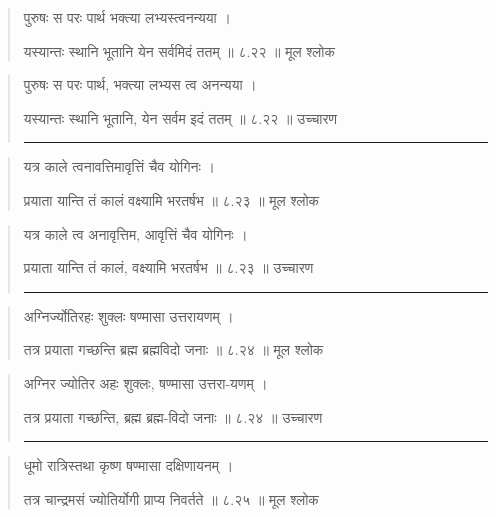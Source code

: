 \begin{quotation} 

पुरुषः स परः पार्थ भक्त्या लभ्यस्त्वनन्यया  ।  

यस्यान्तः स्थानि भूतानि येन सर्वमिदं ततम्‌  ॥ ८.२२ ॥  मूल श्लोक
\end{quotation}

\begin{quotation}

पुरुषः स परः पार्थ, भक्त्या लभ्यस त्व अनन्यया  ।  

यस्यान्तः स्थानि भूतानि, येन सर्वम इदं ततम्‌  ॥ ८.२२ ॥  उच्चारण

\noindent\rule{16cm}{0.4pt} 
\end{quotation}


\begin{quotation} 

यत्र काले त्वनावत्तिमावृत्तिं चैव योगिनः  ।  

प्रयाता यान्ति तं कालं वक्ष्यामि भरतर्षभ  ॥ ८.२३ ॥  मूल श्लोक
\end{quotation}

\begin{quotation}

यत्र काले त्व अनावृत्तिम, आवृत्तिं चैव योगिनः  ।  

प्रयाता यान्ति तं कालं, वक्ष्यामि भरतर्षभ  ॥ ८.२३ ॥  उच्चारण

\noindent\rule{16cm}{0.4pt} 
\end{quotation}


\begin{quotation} 

अग्निर्ज्योतिरहः शुक्लः षण्मासा उत्तरायणम्‌  ।  

तत्र प्रयाता गच्छन्ति ब्रह्म ब्रह्मविदो जनाः  ॥ ८.२४ ॥  मूल श्लोक
\end{quotation}

\begin{quotation}

अग्निर ज्योतिर अहः शुक्लः, षण्मासा उत्तरा-यणम्‌  ।  

तत्र प्रयाता गच्छन्ति, ब्रह्म ब्रह्म-विदो जनाः  ॥ ८.२४ ॥  उच्चारण

\noindent\rule{16cm}{0.4pt} 
\end{quotation}


\begin{quotation} 

धूमो रात्रिस्तथा कृष्ण षण्मासा दक्षिणायनम्‌  ।  

तत्र चान्द्रमसं ज्योतिर्योगी प्राप्य निवर्तते  ॥ ८.२५ ॥  मूल श्लोक
\end{quotation}

